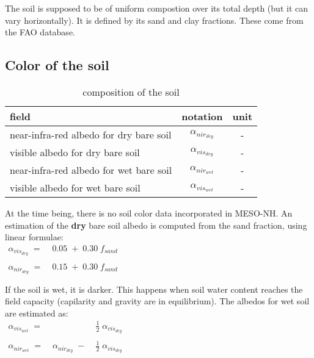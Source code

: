 The soil is supposed to be of uniform compostion over its total depth
(but it can vary horizontally).
It is defined by its sand and clay fractions. These come from the FAO
database.

\subsection{Color of the soil}

\begin{table}[h]
\hspace*{3.cm}
\begin{tabular}{||l|c|c||}
\hline
\hline
field & notation &  unit \\
\hline
\hline
near-infra-red albedo for dry bare soil & $\alpha_{{nir}_{dry}}$ &- \\
visible albedo for dry bare soil & $\alpha_{{vis}_{dry}}$ &- \\
near-infra-red albedo for wet bare soil & $\alpha_{{nir}_{wet}}$ &- \\
visible albedo for wet bare soil & $\alpha_{{vis}_{wet}}$ &- \\
\hline
\hline
\end{tabular}
\caption{composition of the soil
\label{paramCOLOR}}
\end{table}

At the time being, there is no soil color data incorporated in MESO-NH.
An estimation of the {\bf dry} bare soil albedo is computed
from the sand fraction, using linear formulae:\\

$
\begin{array}{ccc}
\alpha_{{vis}_{dry}}\; =\;& 0.05\; +\; 0.30 \; f_{sand}\\
&&\\
\alpha_{{nir}_{dry}}\; =\;& 0.15\; +\; 0.30 \; f_{sand}\\
&&\\
&&
\end{array}
$\\

If the soil is wet, it is darker.
This happens when soil water content reaches the field capacity
(capilarity and gravity are in equilibrium).
The albedos for wet soil are estimated as:\\

$
\begin{array}{ccc}
\alpha_{{vis}_{wet}}\; =\;&                        &  \;\frac{1}{2} \; \alpha_{{vis}_{dry}}\\
&&\\
\alpha_{{nir}_{wet}}\; =\;& \alpha_{{nir}_{dry}} \; - & \; \frac{1}{2} \; \alpha_{{vis}_{dry}}\\
&&\\
&&
\end{array}
$\\


